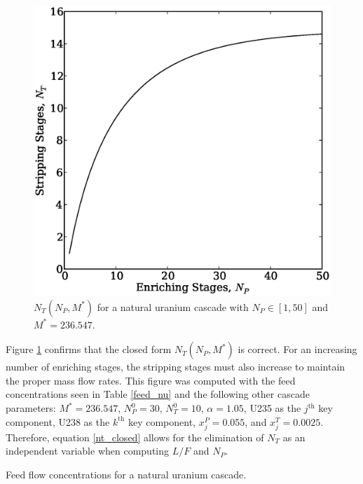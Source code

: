 \documentclass[preprint,12pt]{elsarticle}
\newcommand{\nuc}[2]{{#1}{#2}}
\newcommand{\jth}[0]{$j^{\mbox{th}}$ }
\newcommand{\kth}[0]{$k^{\mbox{th}}$ }
\begin{document}
\begin{figure}[htpb]
\begin{center}
\includegraphics[scale=0.5]{nt_closed.eps}
\caption{$N_T(N_P, M^*)$ for a natural uranium cascade with $N_P\in[1,50]$ and 
    $M^*=236.547$.}
\label{nt_closed_fig}
\end{center}
\end{figure}

Figure \ref{nt_closed_fig} confirms that the closed form $N_T(N_P, M^*)$ is correct.
For an increasing number of enriching stages, the stripping stages must also 
increase to maintain the proper mass flow rates.
This figure was computed 
with the feed concentrations seen in Table \ref{feed_nu} and the following other 
cascade parameters: $M^*=236.547$, $N_P^0=30$, $N_T^0=10$, $\alpha=1.05$, 
\nuc{U}{235} as the \jth key component, \nuc{U}{238} as the \kth key component, 
$x_j^P=0.055$, and $x_j^T=0.0025$.
Therefore, equation \ref{nt_closed} allows for the elimination of $N_T$ as an 
independent variable when computing $L/F$ and $N_P$.  

\begin{table}[htbp]
\begin{center}
\caption{Feed flow concentrations for a natural uranium cascade.}

\label{feed_nu}
\end{center}
\end{table}
\end{document}
